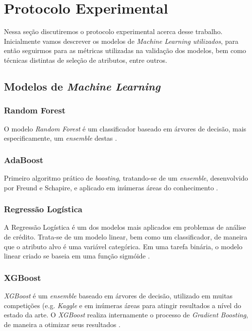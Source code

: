 \section{Protocolo Experimental}
Nessa seção discutiremos o protocolo experimental acerca desse trabalho. Inicialmente vamos descrever os modelos de \textit{Machine Learning utilizados}, para então seguirmos para as métricas utilizadas na validação dos modelos, bem como técnicas distintas de seleção de atributos, entre outros.

\subsection{Modelos de \textit{Machine Learning}}

\subsubsection{\textbf{Random Forest}}

O modelo \textit{Random Forest} é um classificador baseado em árvores de decisão, mais especificamente, um \textit{ensemble} destas \cite{b1}.

\subsubsection{\textbf{AdaBoost}}

Primeiro algoritmo prático de \textit{boosting}, tratando-se de um \textit{ensemble}, desenvolvido por Freund e Schapire, e aplicado em inúmeras áreas do conhecimento \cite{b2}.

\subsubsection{\textbf{Regressão Logística}}

A Regressão Logística é um dos modelos mais aplicados em problemas de análise de crédito. Trata-se de um modelo linear, bem como um classificador, de maneira que o atributo alvo é uma variável categórica. Em uma tarefa binária, o modelo linear criado se baseia em uma função sigmóide \cite{b1}.

\subsubsection{\textbf{XGBoost}}

\textit{XGBoost} é um \textit{ensemble} baseado em árvores de decisão, utilizado em muitas competições (e.g. \textit{Kaggle} e em inúmeras áreas para atingir resultados a nível do estado da arte. O \textit{XGBoost} realiza internamente o processo de \textit{Gradient Boosting}, de maneira a otimizar seus resultados \cite{b3}.


